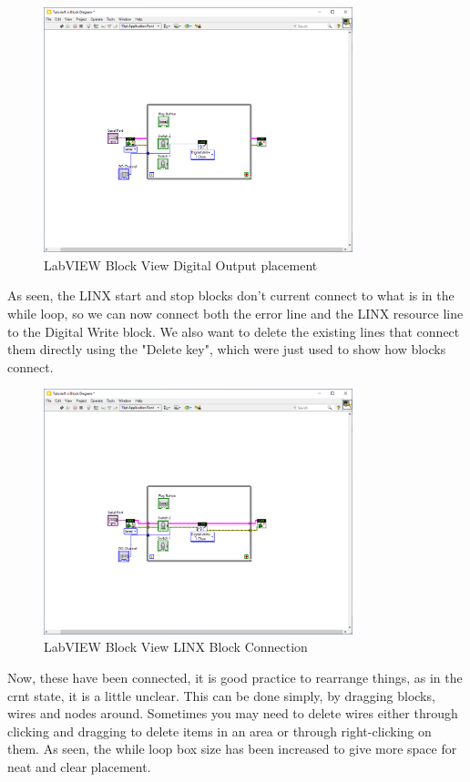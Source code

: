 \documentclass[a4paper,11pt]{report}
\begin{document}
\begin{figure}[H]
\centering
\includegraphics[width=0.8\textwidth]{screenshots/labview21}
\caption{LabVIEW Block View Digital Output placement}
\end{figure}

As seen, the LINX start and stop blocks don't current connect to what is in the while loop, so we can now connect both the error line and the LINX resource line to the Digital Write block. We also want to delete the existing lines that connect them directly using the "Delete key", which were just used to show how blocks connect.

\begin{figure}[H]
\centering
\includegraphics[width=0.8\textwidth]{screenshots/labview22}
\caption{LabVIEW Block View LINX Block Connection}
\end{figure}

Now, these have been connected, it is good practice to rearrange things, as in the \gls{crnt} state, it is a little unclear. This can be done simply, by dragging blocks, wires and nodes around. Sometimes you may need to delete wires either through clicking and dragging to delete items in an area or through right-clicking on them. As seen, the while loop box size has been increased to give more space for neat and clear placement.
\end{document}
